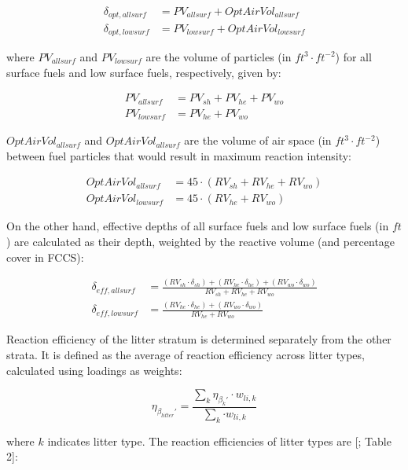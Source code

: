 \documentclass[]{book}
\begin{document}
\begin{eqnarray}
\delta_{opt, allsurf} &= PV_{allsurf} +OptAirVol_{allsurf}\\
\delta_{opt, lowsurf} &= PV_{lowsurf} +OptAirVol_{lowsurf}
\end{eqnarray}

where \(PV_{allsurf}\) and \(PV_{lowsurf}\) are the volume of particles
(in \(ft^3 \cdot ft^{-2}\)) for all surface fuels and low surface fuels,
respectively, given by:

\begin{eqnarray}
PV_{allsurf} &= PV_{sh} + PV_{he} + PV_{wo}\\
PV_{lowsurf} &= PV_{he} + PV_{wo}
\end{eqnarray}

\(OptAirVol_{allsurf}\) and \(OptAirVol_{allsurf}\) are the volume of
air space (in \(ft^3 \cdot ft^{-2}\)) between fuel particles that would
result in maximum reaction intensity:

\begin{eqnarray}
OptAirVol_{allsurf} &= 45\cdot (RV_{sh} + RV_{he} + RV_{wo})\\
OptAirVol_{lowsurf} &= 45\cdot (RV_{he} + RV_{wo})
\end{eqnarray}

On the other hand, effective depths of all surface fuels and low surface
fuels (in \(ft\)) are calculated as their depth, weighted by the
reactive volume (and percentage cover in FCCS):

\begin{eqnarray}
\delta_{eff, allsurf} &= \frac{(RV_{sh}\cdot \delta_{sh}) +(RV_{he}\cdot \delta_{he}) + (RV_{wo}\cdot \delta_{wo})}{RV_{sh} +RV_{he}+RV_{wo}}\\
\delta_{eff, lowsurf} &= \frac{(RV_{he}\cdot \delta_{he}) + (RV_{wo}\cdot \delta_{wo})}{RV_{he}+RV_{wo}}
\end{eqnarray}

Reaction efficiency of the litter stratum is determined separately from
the other strata. It is defined as the average of reaction efficiency
across litter types, calculated using loadings as weights:

\begin{equation}
\eta_{\beta_{litter}'} = \frac{\sum_{k} {\eta_{\beta_{k}'}\cdot w_{li,k}}}{\sum_{k} {\cdot w_{li,k}}}
\end{equation}

where \(k\) indicates litter type. The reaction efficiencies of litter
types are {[}\citet{Prichard2013}; Table 2{]}:
\end{document}
